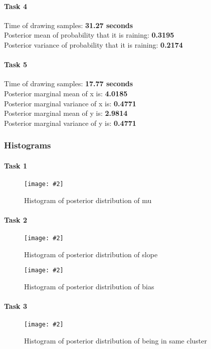\documentclass{article}
\newcommand{\centerfigcap}[3]{\begin{figure}[H]
\begin{center}\texttt{[image: \#2]} \caption{#3}\end{center}
\end{figure}}
\begin{document}
\paragraph{Task 4}
Time of drawing samples: \textbf{31.27 seconds}\\
Posterior mean of probability that it is raining: \textbf{0.3195}\\
Posterior variance of probability that it is raining: \textbf{0.2174}
\paragraph{Task 5}
Time of drawing samples: \textbf{17.77 seconds}\\
Posterior marginal mean of x is: \textbf{4.0185}\\
Posterior marginal variance of x is: \textbf{0.4771}\\
Posterior marginal mean of y is: \textbf{2.9814}\\
Posterior marginal variance of y is: \textbf{0.4771}
\subsubsection{Histograms}
\paragraph{Task 1}
\centerfigcap{0.6}{../figures/Importance_Sampling_plt_hist_program_1_d_0}{Histogram of posterior distribution of mu}
\paragraph{Task 2}

\begin{minipage}{.5\textwidth}
  \centering
  \centerfigcap{1}{../figures/Importance_Sampling_plt_hist_program_2_d_0}{Histogram of posterior distribution of slope}
\end{minipage}%
\begin{minipage}{.5\textwidth}
  \centering
  \centerfigcap{1}{../figures/Importance_Sampling_plt_hist_program_2_d_1}{Histogram of posterior distribution of bias}
\end{minipage}

\paragraph{Task 3}
\centerfigcap{0.75}{../figures/Importance_Sampling_plt_hist_program_3_d_0}{Histogram of posterior distribution of being in same cluster}
\end{document}
